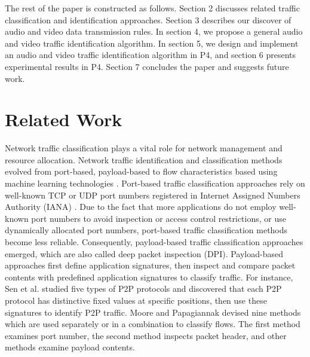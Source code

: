 \documentclass[master]{thesis}
\begin{document}
The rest of the paper is constructed as follows. Section 2 discusses related traffic classification and identification approaches. Section 3 describes our discover of audio and video data transmission rules.  In section 4, we propose a general audio and video traffic identification algorithm. In section 5, we design and implement an audio and video traffic identification algorithm in P4, and section 6 presents experimental results in P4. Section 7 concludes the paper and suggests future work.

\chapter{Related Work}
\label{chap:related.work}

Network traffic classification plays a vital role for network management and resource allocation. Network traffic identification and classification methods evolved from port-based, payload-based to flow characteristics based using machine learning technologies \cite{nguyen2008survey, pacheco2018towards}.  Port-based traffic classification approaches rely on well-known TCP or UDP port numbers registered in Internet Assigned Numbers Authority (IANA) \cite{iana2017}. Due to the fact that more applications do not employ well-known port numbers to avoid inspection or access control restrictions, or use dynamically allocated port numbers, port-based traffic classification methods become less reliable. Consequently, payload-based traffic classification approaches emerged, which are also called deep packet inspection (DPI). Payload-based approaches first define application signatures, then inspect and compare packet contents with predefined application signatures to classify traffic. For instance, Sen et al. \cite{sen2004accurate} studied five types of P2P protocols and discovered that each P2P protocol has distinctive fixed values at specific positions, then use these signatures to identify P2P traffic. Moore and Papagiannak \cite{moore2005toward} devised nine methods which are used separately or in a combination to classify flows. The first method examines port number, the second method inspects packet header, and other methods examine payload contents. 
\end{document}
